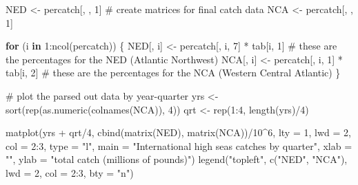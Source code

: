 \documentclass[
  letterpaper,
  oneside,
  open=any]{scrbook}
\newenvironment{Shaded}{\begin{snugshade}}{\end{snugshade}}
\newcommand{\AttributeTok}[1]{\textcolor[rgb]{0.40,0.45,0.13}{#1}}
\newcommand{\CommentTok}[1]{\textcolor[rgb]{0.37,0.37,0.37}{#1}}
\newcommand{\ControlFlowTok}[1]{\textcolor[rgb]{0.00,0.23,0.31}{\textbf{#1}}}
\newcommand{\DecValTok}[1]{\textcolor[rgb]{0.68,0.00,0.00}{#1}}
\newcommand{\FunctionTok}[1]{\textcolor[rgb]{0.28,0.35,0.67}{#1}}
\newcommand{\NormalTok}[1]{\textcolor[rgb]{0.00,0.23,0.31}{#1}}
\newcommand{\OtherTok}[1]{\textcolor[rgb]{0.00,0.23,0.31}{#1}}
\newcommand{\SpecialCharTok}[1]{\textcolor[rgb]{0.37,0.37,0.37}{#1}}
\newcommand{\StringTok}[1]{\textcolor[rgb]{0.13,0.47,0.30}{#1}}
\begin{document}
\begin{Shaded}
\begin{Highlighting}[]
\NormalTok{NED }\OtherTok{\textless{}{-}}\NormalTok{ percatch[, , }\DecValTok{1}\NormalTok{]   }\CommentTok{\# create matrices for final catch data}
\NormalTok{NCA }\OtherTok{\textless{}{-}}\NormalTok{ percatch[, , }\DecValTok{1}\NormalTok{]}

\ControlFlowTok{for}\NormalTok{ (i }\ControlFlowTok{in} \DecValTok{1}\SpecialCharTok{:}\FunctionTok{ncol}\NormalTok{(percatch))  \{ }
\NormalTok{  NED[, i] }\OtherTok{\textless{}{-}}\NormalTok{ percatch[, i, }\DecValTok{7}\NormalTok{] }\SpecialCharTok{*}\NormalTok{ tab[i, }\DecValTok{1}\NormalTok{]   }\CommentTok{\# these are the percentages for the NED (Atlantic Northwest)}
\NormalTok{  NCA[, i] }\OtherTok{\textless{}{-}}\NormalTok{ percatch[, i, }\DecValTok{1}\NormalTok{] }\SpecialCharTok{*}\NormalTok{ tab[i, }\DecValTok{2}\NormalTok{]   }\CommentTok{\# these are the percentages for the NCA (Western Central Atlantic)}
\NormalTok{  \}}

\CommentTok{\# plot the parsed out data by year{-}quarter}
\NormalTok{yrs }\OtherTok{\textless{}{-}} \FunctionTok{sort}\NormalTok{(}\FunctionTok{rep}\NormalTok{(}\FunctionTok{as.numeric}\NormalTok{(}\FunctionTok{colnames}\NormalTok{(NCA)), }\DecValTok{4}\NormalTok{))}
\NormalTok{qrt }\OtherTok{\textless{}{-}} \FunctionTok{rep}\NormalTok{(}\DecValTok{1}\SpecialCharTok{:}\DecValTok{4}\NormalTok{, }\FunctionTok{length}\NormalTok{(yrs)}\SpecialCharTok{/}\DecValTok{4}\NormalTok{)}

\FunctionTok{matplot}\NormalTok{(yrs }\SpecialCharTok{+}\NormalTok{ qrt}\SpecialCharTok{/}\DecValTok{4}\NormalTok{, }\FunctionTok{cbind}\NormalTok{(}\FunctionTok{matrix}\NormalTok{(NED), }\FunctionTok{matrix}\NormalTok{(NCA))}\SpecialCharTok{/}\DecValTok{10}\SpecialCharTok{\^{}}\DecValTok{6}\NormalTok{, }\AttributeTok{lty =} \DecValTok{1}\NormalTok{, }\AttributeTok{lwd =} \DecValTok{2}\NormalTok{, }
        \AttributeTok{col =} \DecValTok{2}\SpecialCharTok{:}\DecValTok{3}\NormalTok{, }\AttributeTok{type =} \StringTok{"l"}\NormalTok{, }\AttributeTok{main =} \StringTok{"International high seas catches by quarter"}\NormalTok{, }
        \AttributeTok{xlab =} \StringTok{""}\NormalTok{, }\AttributeTok{ylab =} \StringTok{"total catch (millions of pounds)"}\NormalTok{)}
\FunctionTok{legend}\NormalTok{(}\StringTok{"topleft"}\NormalTok{, }\FunctionTok{c}\NormalTok{(}\StringTok{"NED"}\NormalTok{, }\StringTok{"NCA"}\NormalTok{), }\AttributeTok{lwd =} \DecValTok{2}\NormalTok{, }\AttributeTok{col =} \DecValTok{2}\SpecialCharTok{:}\DecValTok{3}\NormalTok{, }\AttributeTok{bty =} \StringTok{"n"}\NormalTok{)}
\end{Highlighting}
\end{Shaded}
\end{document}
